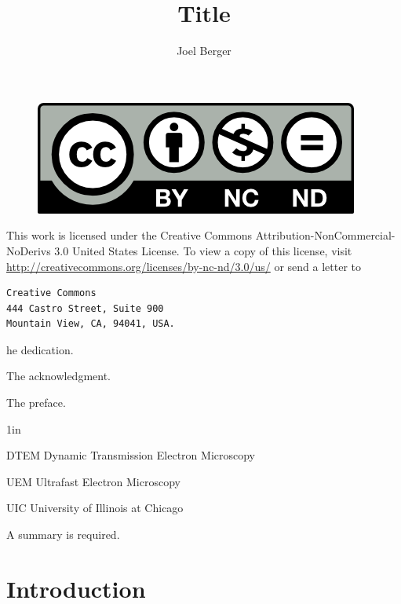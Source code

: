 \documentclass{uicthesi}
\title{Title}
\author{Joel Berger}
\begin{document}
\maketitle

\newpage
\begin{figure}
  \centering
  \includegraphics{by-nc-nd}
\end{figure}
This work is licensed under the Creative Commons Attribution-NonCommercial-NoDerivs 3.0 United States License.
To view a copy of this license, visit \url{http://creativecommons.org/licenses/by-nc-nd/3.0/us/} or send a letter to
\begin{verbatim}
Creative Commons
444 Castro Street, Suite 900
Mountain View, CA, 94041, USA.
\end{verbatim}


\dedication
The dedication.
 
\acknowledgment
The acknowledgment.
 
\preface
The preface.
 
\tableofcontents
\listoftables
\listoffigures
 
\listofabbreviations
\begin{list}
{}
{\setlength
   {}{1in}
    \setlength{\leftmargin}{1.5in}
    \setlength{\labelsep}{.5in}
    \setlength{\rightmargin}{\leftmargin}}
\item[DTEM\hfill] Dynamic Transmission Electron Microscopy
\item[UEM\hfill] Ultrafast Electron Microscopy
\item[UIC\hfill] University of Illinois at Chicago
\end{list}
 
\summary
A summary is required.

\chapter{Introduction}

 
%
%
\end{document}
